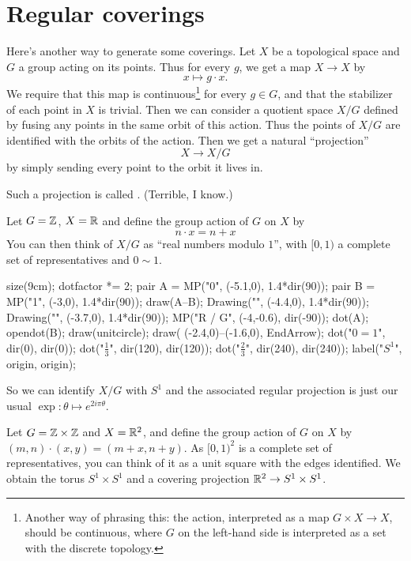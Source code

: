 \section{Regular coverings}

Here's another way to generate some coverings.
Let $X$ be a topological space and $G$ a group acting on its points.
Thus for every $g$, we get a map $X \to X$ by 
\[ x \mapsto g \cdot x. \]
We require that this map is continuous\footnote{%
	Another way of phrasing this: the action,
	interpreted as a map $G \times X \to X$, should be continuous,
	where $G$ on the left-hand side is interpreted as a set with
	the discrete topology.}
for every $g \in G$, and that the stabilizer of each point in $X$ is trivial.
Then we can consider a quotient space $X/G$ defined by fusing any points
in the same orbit of this action.
Thus the points of $X/G$ are identified with the orbits of the action.
Then we get a natural ``projection''
\[ X \to X/G \]
by simply sending every point to the orbit it lives in.
\begin{definition}
	Such a projection is called .
	(Terrible, I know.)
\end{definition}

\begin{example}[$\RR \to S^1$ is regular]
	Let $G = \mathbb Z$, $X = \mathbb R$
	and define the group action of $G$ on $X$ by 
	\[ n \cdot x = n + x \]
	You can then think of $X/G$ as ``real numbers modulo $1$'',
	with $[0,1)$ a complete set of representatives and $0 \sim 1$. %
	\begin{center}
		\begin{asy}
			size(9cm);
			dotfactor *= 2;
			pair A = MP("0", (-5.1,0), 1.4*dir(90));
			pair B = MP("1", (-3,0), 1.4*dir(90));
			draw(A--B);
			Drawing("", (-4.4,0), 1.4*dir(90));
			Drawing("", (-3.7,0), 1.4*dir(90));
			MP("\mathbb R / G", (-4,-0.6), dir(-90));
			dot(A); opendot(B);
			draw(unitcircle);
			draw( (-2.4,0)--(-1.6,0), EndArrow);
			dot("$0=1$", dir(0), dir(0));
			dot("$\frac13$", dir(120), dir(120));
			dot("$\frac23$", dir(240), dir(240));
			label("$S^1$", origin, origin);
		\end{asy}
	\end{center}
	So we can identify $X/G$ with $S^1$
	and the associated regular projection
	is just our usual $\exp : \theta \mapsto e^{2i\pi \theta}$.
\end{example}
	
\begin{example}
	Let $G = \mathbb Z \times \mathbb Z$ and $X = \mathbb R^2$,
	and define the group action of $G$ on $X$ by $(m,n) \cdot (x,y)
	= (m+x, n+y)$.
	As $[0,1)^2$ is a complete set of representatives, %
	you can think of it as a unit square with the edges identified.
	We obtain the torus $S^1 \times S^1$
	and a covering projection $\mathbb R^2 \to S^1 \times S^1$.
\end{example}

